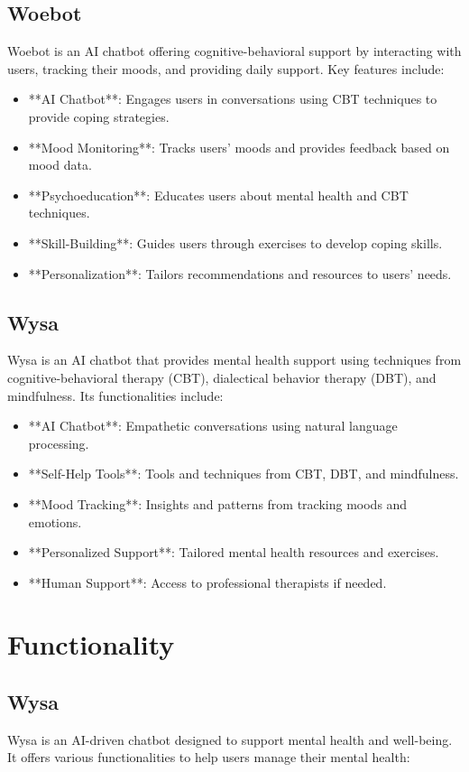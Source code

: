 \subsection{Woebot}
Woebot is an AI chatbot offering cognitive-behavioral support by interacting with users, tracking their moods, and providing daily support. Key features include:
\begin{itemize}
    \item **AI Chatbot**: Engages users in conversations using CBT techniques to provide coping strategies.
    \item **Mood Monitoring**: Tracks users' moods and provides feedback based on mood data.
    \item **Psychoeducation**: Educates users about mental health and CBT techniques.
    \item **Skill-Building**: Guides users through exercises to develop coping skills.
    \item **Personalization**: Tailors recommendations and resources to users' needs.
\end{itemize}

\subsection{Wysa}
Wysa is an AI chatbot that provides mental health support using techniques from cognitive-behavioral therapy (CBT), dialectical behavior therapy (DBT), and mindfulness. Its functionalities include:
\begin{itemize}
    \item **AI Chatbot**: Empathetic conversations using natural language processing.
    \item **Self-Help Tools**: Tools and techniques from CBT, DBT, and mindfulness.
    \item **Mood Tracking**: Insights and patterns from tracking moods and emotions.
    \item **Personalized Support**: Tailored mental health resources and exercises.
    \item **Human Support**: Access to professional therapists if needed.
\end{itemize}

\section{Functionality}

\subsection{Wysa}
Wysa is an AI-driven chatbot designed to support mental health and well-being. It offers various functionalities to help users manage their mental health:

